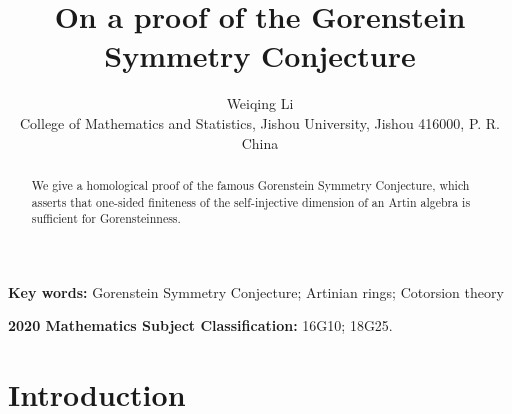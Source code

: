 \documentclass[11pt,a4paper]{article}
\begin{document}
\title{\Large \bf  On  a  proof of  the Gorenstein  Symmetry Conjecture
}



 \vskip 0.5cm
\author{{\normalsize  Weiqing Li }\\
{\small College of Mathematics and Statistics, Jishou University, Jishou 416000,  P. R. China}\date{}}
 \maketitle
 \vskip-1cm


\begin{abstract}  We give  a homological proof of  the famous Gorenstein Symmetry Conjecture, which asserts that   one-sided finiteness of the self-injective
dimension of an Artin algebra is sufficient for Gorensteinness.
\end{abstract}







\def\s{\stackrel}
\def\Longrightarrow{{\longrightarrow}}
\def\A{\mathcal{A}}
\def\B{\mathcal{B}}
\def\C{\mathcal{C}}
\def\D{\mathcal{D}}
\def\T{\mathcal{T}}
\def\R{\mathcal{R}}
\def\P{\mathcal{P}}
\def\S{\mathcal{S}}
\def\H{\mathcal{H}}
\def\U{\mathscr{U}}
\def\V{\mathscr{V}}
\def\M{\mathscr{M}}
\def\N{\mathcal{N}}
\def\W{\mathscr{W}}
\def\X{\mathscr{X}}
\def\Y{\mathscr{Y}}
\def\Z{\mathcal {Z}}
\def\I{\mathcal {I}}
\def\add{\mbox{add}}
\def\Aut{\mbox{Aut}}
\def\coker{\mbox{coker}}
\def\deg{\mbox{deg}}
\def\diag{\mbox{diag}}
\def\dim{\mbox{dim}}
\def\End{\mbox{End}}
\def\Ext{\mbox{Ext}}
\def\Hom{\mbox{Hom}}
\def\Gr{\mbox{Gr}}
\def\id{\mbox{id}}
\def\Im{\mbox{Im}}
\def\ind{\mbox{ind}}
\def\mod{\mbox{mod}}
\def\mul{\multiput}
\def\c{\circ}
\def \text{\mbox}




\textbf{Key words:}    Gorenstein Symmetry Conjecture;   Artinian rings;  Cotorsion theory

\medskip

\textbf{2020 Mathematics Subject Classification:}  16G10; 18G25.



\section{ Introduction}
\end{document}
